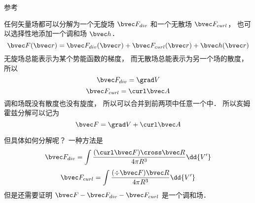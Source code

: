 
参考 \cite{GriffE}

任何矢量场都可以分解为一个无旋场 $\bvec F_{div}$ 和一个无散场 $\bvec F_{curl}$， 也可以选择性地添加一个调和场 $\bvec h$．
\begin{equation}
\bvec F(\bvec r) = \bvec F_{div}(\bvec r) + \bvec F_{curl}(\bvec r) + \bvec h(\bvec r)
\end{equation}
无旋场总能表示为某个势能函数的梯度， 而无散场总能表示为另一个场的散度， 所以
\begin{equation}
\bvec F_{div} = \grad V
\end{equation}
\begin{equation}
\bvec F_{curl} = \curl \bvec A
\end{equation}
调和场既没有散度也没有旋度， 所以可以合并到前两项中任意一个中． 所以亥姆霍兹分解可以记为
\begin{equation}
\bvec F = \grad V + \curl \bvec A
\end{equation}

但具体如何分解呢？ 一种方法是
\begin{equation}
\bvec F_{div} = \int \frac{(\curl \bvec F)\cross \bvec R}{4\pi R^3} \dd{V'}
\end{equation}
\begin{equation}
\bvec F_{curl} = \int \frac{(\div \bvec F)\bvec R}{4\pi R^3} \dd{V'}
\end{equation}
但是还需要证明 $\bvec F - \bvec F_{div} - \bvec F_{curl}$ 是一个调和场．
